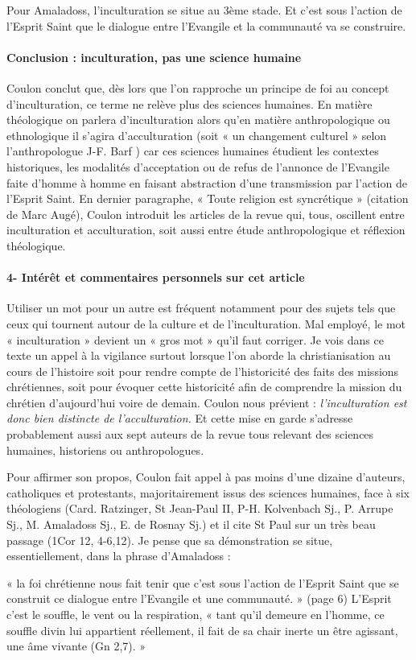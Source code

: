 Pour Amaladoss, l’inculturation se situe au 3ème stade. Et c’est sous l’action de l’Esprit Saint que le dialogue entre l’Evangile et la communauté va se construire. 
\paragraph{Conclusion : inculturation, pas une science humaine}
Coulon conclut que, dès lors que l’on rapproche un principe de foi au concept d’inculturation, ce terme ne relève plus des sciences humaines. En matière théologique on parlera d’inculturation alors qu’en matière anthropologique ou ethnologique il s’agira d’acculturation (soit « un changement culturel » selon l’anthropologue J-F. Barf ) car ces sciences humaines étudient les contextes historiques, les modalités d’acceptation ou de refus de l’annonce de l’Evangile faite d’homme à homme en faisant abstraction d’une transmission par l’action de l’Esprit Saint. 
En dernier paragraphe, « Toute religion est syncrétique » (citation de Marc Augé), Coulon introduit les articles de la revue qui, tous, oscillent entre inculturation et acculturation, soit aussi entre étude anthropologique et réflexion théologique. 


\paragraph{4-	Intérêt et commentaires personnels sur cet article }

Utiliser un mot pour un autre est fréquent notamment pour des sujets tels que ceux qui tournent autour de la culture et de l’inculturation. Mal employé, le mot « inculturation » devient un « gros mot » qu’il faut corriger. Je vois dans ce texte un appel à la vigilance surtout lorsque l’on aborde la christianisation au cours de l’histoire soit pour rendre compte de l’historicité des faits des missions chrétiennes, soit pour évoquer cette historicité afin de comprendre la mission du chrétien d’aujourd’hui voire de demain. Coulon nous prévient : \textit{l’inculturation est donc bien distincte de l’acculturation.} Et cette mise en garde s’adresse probablement aussi aux sept auteurs de la revue tous relevant des sciences humaines, historiens ou anthropologues. 



Pour affirmer son propos, Coulon fait appel à pas moins d’une dizaine d’auteurs, catholiques et protestants, majoritairement issus des sciences humaines, face à six théologiens (Card. Ratzinger, St Jean-Paul II, P-H. Kolvenbach Sj., P. Arrupe Sj., M. Amaladoss Sj., E. de Rosnay Sj.) et il cite St Paul sur un très beau passage (1Cor 12, 4-6,12). Je pense que sa démonstration se situe, essentiellement, dans la phrase d’Amaladoss : 
\begin{singlequote}
    « la foi chrétienne nous fait tenir que c’est sous l’action de l’Esprit Saint que se construit ce dialogue entre l’Evangile et une communauté. » (page 6)  L’Esprit c’est le souffle, le vent ou la respiration, « tant qu’il demeure en l’homme, ce souffle divin lui appartient réellement, il fait de sa chair inerte un être agissant, une âme vivante (Gn 2,7). »  
\end{singlequote}


